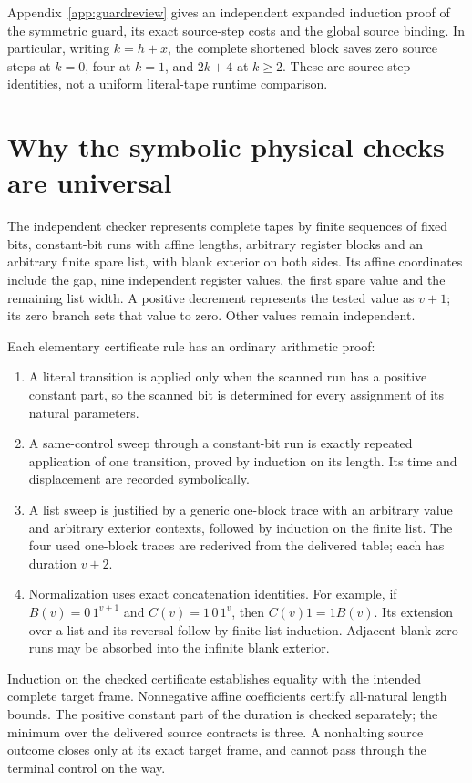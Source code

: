 \documentclass[11pt,letterpaper]{article}
\begin{document}



Appendix~\ref{app:guardreview} gives an independent expanded induction
proof of the symmetric guard, its exact source-step costs and the
global source binding. In particular, writing $k=h+x$, the complete
shortened block saves zero source steps at $k=0$, four at $k=1$, and
$2k+4$ at $k\ge2$. These are source-step identities, not a uniform
literal-tape runtime comparison.

\section{Why the symbolic physical checks are universal}
\label{sec:universal}

The independent checker represents complete tapes by finite sequences
of fixed bits, constant-bit runs with affine lengths, arbitrary register
blocks and an arbitrary finite spare list, with blank exterior on both
sides. Its affine coordinates include the gap, nine independent register
values, the first spare value and the remaining list width. A positive
decrement represents the tested value as $v+1$; its zero branch sets that
value to zero. Other values remain independent.

Each elementary certificate rule has an ordinary arithmetic proof:
\begin{enumerate}
\item A literal transition is applied only when the scanned run has
      a positive constant part, so the scanned bit is determined for
      every assignment of its natural parameters.
\item A same-control sweep through a constant-bit run is exactly
      repeated application of one transition, proved by induction on
      its length. Its time and displacement are recorded symbolically.
\item A list sweep is justified by a generic one-block trace with an
      arbitrary value and arbitrary exterior contexts, followed by
      induction on the finite list. The four used one-block traces are
      rederived from the delivered table; each has duration $v+2$.
\item Normalization uses exact concatenation identities. For example,
      if $B(v)=0\,1^{v+1}$ and $C(v)=1\,0\,1^v$, then
      $C(v)1=1B(v)$. Its extension over a list and its reversal follow
      by finite-list induction. Adjacent blank zero runs may be absorbed
      into the infinite blank exterior.
\end{enumerate}
Induction on the checked certificate establishes equality with the
intended complete target frame. Nonnegative affine coefficients certify
all-natural length bounds. The positive constant part of the duration
is checked separately; the minimum over the delivered source contracts
is three. A nonhalting source outcome closes only at its exact target
frame, and cannot pass through the terminal control on the way.
\end{document}
